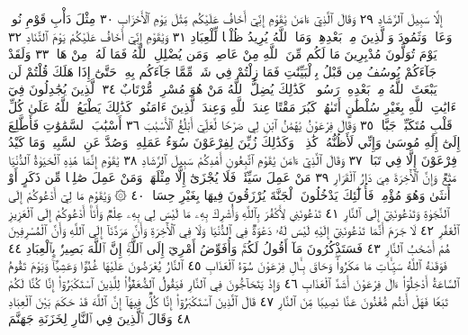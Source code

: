 إِلَّا سَبِيلَ ٱلرَّشَادِ ٢٩ وَقَالَ ٱلَّذِيٓ ءَامَنَ يَٰقَوْمِ إِنِّيٓ أَخَافُ
عَلَيْكُم مِّثْلَ يَوْمِ ٱلْأَحْزَابِ ٣٠ مِثْلَ دَأْبِ قَوْمِ نُوحࣲ وَعَادࣲ
وَثَمُودَ وَٱلَّذِينَ مِنۢ بَعْدِهِمْۚ وَمَا ٱللَّهُ يُرِيدُ ظُلْمࣰا لِّلْعِبَادِ ٣١
وَيَٰقَوْمِ إِنِّيٓ أَخَافُ عَلَيْكُمْ يَوْمَ ٱلتَّنَادِ ٣٢ يَوْمَ تُوَلُّونَ مُدْبِرِينَ
مَا لَكُم مِّنَ ٱللَّهِ مِنْ عَاصِمࣲۗ وَمَن يُضْلِلِ ٱللَّهُ فَمَا لَهُۥ مِنْ هَادࣲ ٣٣
وَلَقَدْ جَآءَكُمْ يُوسُفُ مِن قَبْلُ بِٱلْبَيِّنَٰتِ فَمَا زِلْتُمْ فِي
شَكࣲّ مِّمَّا جَآءَكُم بِهِۦۖ حَتَّىٰٓ إِذَا هَلَكَ قُلْتُمْ لَن يَبْعَثَ ٱللَّهُ
مِنۢ بَعْدِهِۦ رَسُولࣰاۚ كَذَٰلِكَ يُضِلُّ ٱللَّهُ مَنْ هُوَ مُسْرِفࣱ
مُّرْتَابٌ ٣٤ ٱلَّذِينَ يُجَٰدِلُونَ فِيٓ ءَايَٰتِ ٱللَّهِ بِغَيْرِ سُلْطَٰنٍ
أَتَىٰهُمْۖ كَبُرَ مَقْتًا عِندَ ٱللَّهِ وَعِندَ ٱلَّذِينَ ءَامَنُوا۟ۚ كَذَٰلِكَ
يَطْبَعُ ٱللَّهُ عَلَىٰ كُلِّ قَلْبِ مُتَكَبِّرࣲ جَبَّارࣲ ٣٥ وَقَالَ فِرْعَوْنُ
يَٰهَٰمَٰنُ ٱبْنِ لِي صَرْحࣰا لَّعَلِّيٓ أَبْلُغُ ٱلْأَسْبَٰبَ ٣٦ أَسْبَٰبَ
ٱلسَّمَٰوَٰتِ فَأَطَّلِعَ إِلَىٰٓ إِلَٰهِ مُوسَىٰ وَإِنِّي لَأَظُنُّهُۥ كَٰذِبࣰاۚ
وَكَذَٰلِكَ زُيِّنَ لِفِرْعَوْنَ سُوٓءُ عَمَلِهِۦ وَصُدَّ عَنِ ٱلسَّبِيلِۚ
وَمَا كَيْدُ فِرْعَوْنَ إِلَّا فِي تَبَابࣲ ٣٧ وَقَالَ ٱلَّذِيٓ ءَامَنَ
يَٰقَوْمِ ٱتَّبِعُونِ أَهْدِكُمْ سَبِيلَ ٱلرَّشَادِ ٣٨ يَٰقَوْمِ
إِنَّمَا هَٰذِهِ ٱلْحَيَوٰةُ ٱلدُّنْيَا مَتَٰعࣱ وَإِنَّ ٱلْأٓخِرَةَ هِيَ
دَارُ ٱلْقَرَارِ ٣٩ مَنْ عَمِلَ سَيِّئَةࣰ فَلَا يُجْزَىٰٓ إِلَّا مِثْلَهَاۖ
وَمَنْ عَمِلَ صَٰلِحࣰا مِّن ذَكَرٍ أَوْ أُنثَىٰ وَهُوَ مُؤْمِنࣱ فَأُو۟لَٰٓئِكَ
يَدْخُلُونَ ٱلْجَنَّةَ يُرْزَقُونَ فِيهَا بِغَيْرِ حِسَابࣲ ٤٠
۞ وَيَٰقَوْمِ مَا لِيٓ أَدْعُوكُمْ إِلَى ٱلنَّجَوٰةِ وَتَدْعُونَنِيٓ إِلَى ٱلنَّارِ ٤١
تَدْعُونَنِي لِأَكْفُرَ بِٱللَّهِ وَأُشْرِكَ بِهِۦ مَا لَيْسَ لِي بِهِۦ
عِلْمࣱ وَأَنَا۠ أَدْعُوكُمْ إِلَى ٱلْعَزِيزِ ٱلْغَفَّٰرِ ٤٢ لَا جَرَمَ أَنَّمَا
تَدْعُونَنِيٓ إِلَيْهِ لَيْسَ لَهُۥ دَعْوَةࣱ فِي ٱلدُّنْيَا وَلَا فِي ٱلْأٓخِرَةِ
وَأَنَّ مَرَدَّنَآ إِلَى ٱللَّهِ وَأَنَّ ٱلْمُسْرِفِينَ هُمْ أَصْحَٰبُ ٱلنَّارِ ٤٣
فَسَتَذْكُرُونَ مَآ أَقُولُ لَكُمْۚ وَأُفَوِّضُ أَمْرِيٓ إِلَى ٱللَّهِۚ
إِنَّ ٱللَّهَ بَصِيرُۢ بِٱلْعِبَادِ ٤٤ فَوَقَىٰهُ ٱللَّهُ سَيِّـَٔاتِ مَا مَكَرُوا۟ۖ
وَحَاقَ بِـَٔالِ فِرْعَوْنَ سُوٓءُ ٱلْعَذَابِ ٤٥ ٱلنَّارُ يُعْرَضُونَ
عَلَيْهَا غُدُوࣰّا وَعَشِيࣰّاۚ وَيَوْمَ تَقُومُ ٱلسَّاعَةُ أَدْخِلُوٓا۟ ءَالَ
فِرْعَوْنَ أَشَدَّ ٱلْعَذَابِ ٤٦ وَإِذْ يَتَحَآجُّونَ فِي ٱلنَّارِ
فَيَقُولُ ٱلضُّعَفَٰٓؤُا۟ لِلَّذِينَ ٱسْتَكْبَرُوٓا۟ إِنَّا كُنَّا لَكُمْ
تَبَعࣰا فَهَلْ أَنتُم مُّغْنُونَ عَنَّا نَصِيبࣰا مِّنَ ٱلنَّارِ ٤٧ قَالَ
ٱلَّذِينَ ٱسْتَكْبَرُوٓا۟ إِنَّا كُلࣱّ فِيهَآ إِنَّ ٱللَّهَ قَدْ حَكَمَ
بَيْنَ ٱلْعِبَادِ ٤٨ وَقَالَ ٱلَّذِينَ فِي ٱلنَّارِ لِخَزَنَةِ جَهَنَّمَ
